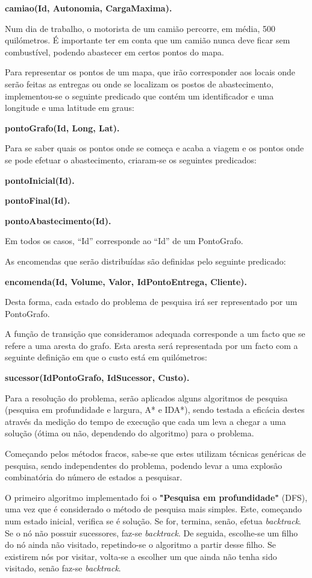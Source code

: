 \documentclass[a4paper]{article}
\begin{document}
\centerline{\textbf{camiao(Id, Autonomia, CargaMaxima).}}

Num dia de trabalho, o motorista de um camião percorre, em média, 500 quilómetros. É importante ter em conta que um camião nunca deve ficar sem combustível, podendo abastecer em certos pontos do mapa. 

Para representar os pontos de um mapa, que irão corresponder aos locais onde serão feitas as entregas ou onde se localizam os postos de abastecimento, implementou-se o seguinte predicado que contém um identificador e uma longitude e uma latitude em graus:

\centerline{\textbf{pontoGrafo(Id, Long, Lat).}}

Para se saber quais os pontos onde se começa e acaba a viagem e os pontos onde se pode efetuar o abastecimento, criaram-se os seguintes predicados:

\centerline{\textbf{pontoInicial(Id).}}

\centerline{\textbf{pontoFinal(Id).}}

\centerline{\textbf{pontoAbastecimento(Id).}}

Em todos os casos, “Id” corresponde ao “Id” de um PontoGrafo.

As encomendas que serão distribuídas são definidas pelo seguinte predicado:

\centerline{\textbf{encomenda(Id, Volume, Valor, IdPontoEntrega, Cliente).}}

Desta forma, cada estado do problema de pesquisa irá ser representado por um PontoGrafo.

A função de transição que consideramos adequada corresponde a um facto que se refere a uma aresta do grafo. Esta aresta será representada por um facto com a seguinte definição em que o custo está em quilómetros:

\centerline{\textbf{sucessor(IdPontoGrafo, IdSucessor, Custo).}}

Para a resolução do problema, serão aplicados alguns algoritmos de pesquisa (pesquisa em profundidade e largura, A* e IDA*), sendo testada a eficácia destes através da medição do tempo de execução que cada um leva a chegar a uma solução (ótima ou não, dependendo do algoritmo) para o problema.

Começando pelos métodos fracos, sabe-se que estes utilizam técnicas genéricas de pesquisa, sendo independentes do problema, podendo levar a uma explosão combinatória do número de estados a pesquisar.

O primeiro algoritmo implementado foi o \textbf{"Pesquisa em profundidade"} (DFS), uma vez que é considerado o método de pesquisa mais simples. Este, começando num estado inicial, verifica se é solução. Se for, termina, senão, efetua \textit{backtrack}. Se o nó não possuir sucessores, faz-se \textit{backtrack}. De seguida, escolhe-se um filho do nó ainda não visitado, repetindo-se o algoritmo a partir desse filho. Se existirem nós por visitar, volta-se a escolher um que ainda não tenha sido visitado, senão faz-se \textit{backtrack}.
\end{document}
